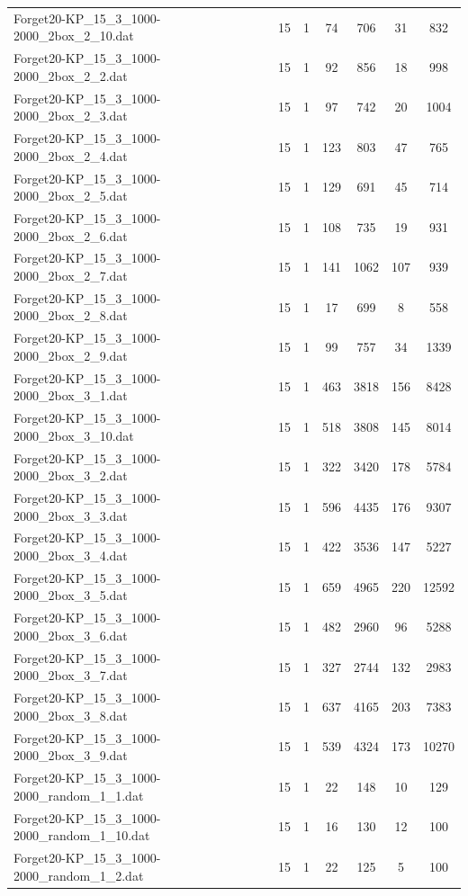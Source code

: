 \begin{table}[!ht]
\begin{tabular}{lcccccc}
Forget20-KP\_15\_3\_1000-2000\_2box\_2\_10.dat & 15 & 1 & 74 & 706 & 31 & 832 \\
Forget20-KP\_15\_3\_1000-2000\_2box\_2\_2.dat & 15 & 1 & 92 & 856 & 18 & 998 \\
Forget20-KP\_15\_3\_1000-2000\_2box\_2\_3.dat & 15 & 1 & 97 & 742 & 20 & 1004 \\
Forget20-KP\_15\_3\_1000-2000\_2box\_2\_4.dat & 15 & 1 & 123 & 803 & 47 & 765 \\
Forget20-KP\_15\_3\_1000-2000\_2box\_2\_5.dat & 15 & 1 & 129 & 691 & 45 & 714 \\
Forget20-KP\_15\_3\_1000-2000\_2box\_2\_6.dat & 15 & 1 & 108 & 735 & 19 & 931 \\
Forget20-KP\_15\_3\_1000-2000\_2box\_2\_7.dat & 15 & 1 & 141 & 1062 & 107 & 939 \\
Forget20-KP\_15\_3\_1000-2000\_2box\_2\_8.dat & 15 & 1 & 17 & 699 & 8 & 558 \\
Forget20-KP\_15\_3\_1000-2000\_2box\_2\_9.dat & 15 & 1 & 99 & 757 & 34 & 1339 \\
Forget20-KP\_15\_3\_1000-2000\_2box\_3\_1.dat & 15 & 1 & 463 & 3818 & 156 & 8428 \\
Forget20-KP\_15\_3\_1000-2000\_2box\_3\_10.dat & 15 & 1 & 518 & 3808 & 145 & 8014 \\
Forget20-KP\_15\_3\_1000-2000\_2box\_3\_2.dat & 15 & 1 & 322 & 3420 & 178 & 5784 \\
Forget20-KP\_15\_3\_1000-2000\_2box\_3\_3.dat & 15 & 1 & 596 & 4435 & 176 & 9307 \\
Forget20-KP\_15\_3\_1000-2000\_2box\_3\_4.dat & 15 & 1 & 422 & 3536 & 147 & 5227 \\
Forget20-KP\_15\_3\_1000-2000\_2box\_3\_5.dat & 15 & 1 & 659 & 4965 & 220 & 12592 \\
Forget20-KP\_15\_3\_1000-2000\_2box\_3\_6.dat & 15 & 1 & 482 & 2960 & 96 & 5288 \\
Forget20-KP\_15\_3\_1000-2000\_2box\_3\_7.dat & 15 & 1 & 327 & 2744 & 132 & 2983 \\
Forget20-KP\_15\_3\_1000-2000\_2box\_3\_8.dat & 15 & 1 & 637 & 4165 & 203 & 7383 \\
Forget20-KP\_15\_3\_1000-2000\_2box\_3\_9.dat & 15 & 1 & 539 & 4324 & 173 & 10270 \\
Forget20-KP\_15\_3\_1000-2000\_random\_1\_1.dat & 15 & 1 & 22 & 148 & 10 & 129 \\
Forget20-KP\_15\_3\_1000-2000\_random\_1\_10.dat & 15 & 1 & 16 & 130 & 12 & 100 \\
Forget20-KP\_15\_3\_1000-2000\_random\_1\_2.dat & 15 & 1 & 22 & 125 & 5 & 100 \\

\end{tabular}
\end{table}
